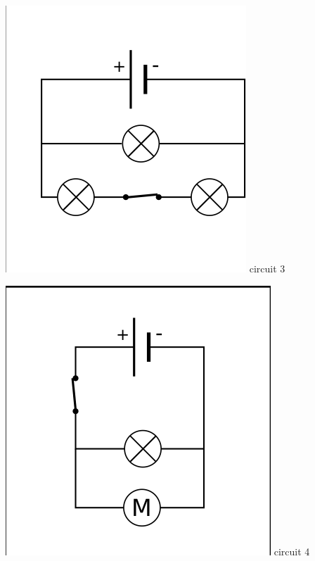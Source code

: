 \documentclass[10pt]{article}
\begin{document}
\begin{center}
\begin{minipage}[c]{0.2\textwidth}
		\centering \includegraphics[width=0.8\columnwidth]{circuit3.png} circuit 3
	\end{minipage}
	\hspace{ 0pt}
	\begin{minipage}[c]{0.2\textwidth}
		\centering \includegraphics[width=0.8\columnwidth]{circuit4.png} circuit 4
	\end{minipage}
	\hspace{ 0pt}


\end{center}
\end{document}
